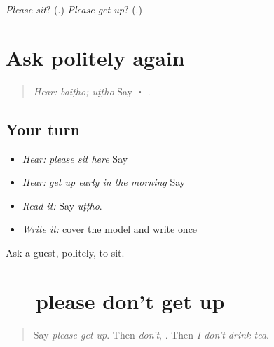 \begin{tcolorbox}[breakable,colback=teal!4,colframe=teal!35!black,title={Before you move on}]
\emph{Please sit}? (\textbf{}.) \emph{Please get up}? (\textbf{}.)
\end{tcolorbox}
\section[\texorpdfstring{\pa{ਬੈਠੋ} · \pa{ਉੱਠੋ} (baiṭho · uṭṭho)}{ਬੈਠੋ · ਉੱਠੋ (baiṭho · uṭṭho)}]{Ask politely again}

\label{lesson:PA-C213-baitho-review}



\begin{quote}
\emph{Hear:} \emph{baiṭho; uṭṭho} Say \textbf{ · }.
\end{quote}

\subsection*{Your turn}
\begin{itemize}
\raggedright
  \item \emph{Hear:} \emph{please sit here} Say \textbf{ }
  \item \emph{Hear:} \emph{get up early in the morning} Say \textbf{  }
  \item \emph{Read it:} \textbf{} Say \emph{uṭṭho}.
  \item \emph{Write it:} cover the model and write \textbf{} once
\end{itemize}

\begin{tcolorbox}[breakable,colback=teal!4,colframe=teal!35!black,title={Before you move on}]
Ask a guest, politely, to sit.
\end{tcolorbox}
\section[\texorpdfstring{\pa{ਨਾ} \pa{ਉੱਠੋ} (nā uṭṭho)}{ਨਾ ਉੱਠੋ (nā uṭṭho)}]{  — please don't get up}

\label{lesson:PA-C213-na-utthho}



\begin{quote}
Say \emph{please get up}. Then \emph{don't}, \textbf{}. Then \emph{I don't drink tea}.
\end{quote}

